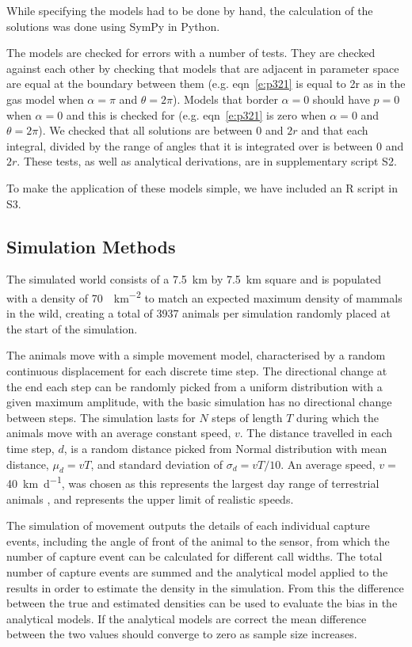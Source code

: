 \documentclass[a4paper,10pt,reqno,oneside]{amsart}
\begin{document}
While specifying the models had to be done by hand, the calculation of the solutions was done using SymPy \citep{sympy} in Python. 

The models are checked for errors with a number of tests. They are checked against each other by checking that models that are adjacent in parameter space are equal at the boundary between them (e.g. eqn~\ref{e:p321} is equal to 2r as in the gas model when $\alpha=\pi$ and $\theta=2\pi$). Models that border $ \alpha = 0$ should have $p = 0$ when $ \alpha = 0$ and this is checked for (e.g. eqn~\ref{e:p321} is zero when $\alpha=0$ and $\theta=2\pi$). We checked that all solutions are between 0 and $2r$ and that each integral, divided by the range of angles that it is integrated over is between 0 and $2r$. These tests, as well as analytical derivations, are in supplementary script S2.


To make the application of these models simple, we have included an R script in S3. 

\subsection{Simulation Methods}

The simulated world consists of a  \SI{7.5}{\kilo\meter} by \SI{7.5}{\kilo\meter} square and is populated with a density of  \SI{70}{\animals\per\kilo\meter\squared} to match an expected maximum density of mammals in the wild\citep{damuth1981population}, creating a total of 3937 animals per simulation randomly placed at the start of the simulation. 

The animals move with a simple movement model, characterised by a random continuous displacement for each discrete time step. The directional change at the end each step can be randomly picked from a uniform distribution with a given maximum amplitude, with the basic simulation has no directional change between steps. The simulation lasts for $N$ steps of length $T$ during which the animals move with an average constant speed, $v$. The distance travelled in each time step, $d$, is a random distance picked from Normal distribution with mean distance, $\mu_d = vT$,  and standard deviation of $\sigma_d = vT/10$. An average speed, $v = $ \SI{40}{\kilo\meter \per \day}, was chosen as this represents the largest day range of terrestrial animals \citep{carbone2005far}, and represents the upper limit of realistic speeds.

The simulation of movement outputs the details of each individual capture events, including the angle of front of the animal to the sensor, from which the number of capture event can be calculated for different call widths. The total number of capture events are summed and the analytical model applied to the results in order to estimate the density in the simulation. From this the difference between the true and estimated densities can be used to evaluate the bias in the analytical models. If the analytical models are correct the mean difference between the two values should converge to zero as sample size increases. 
\end{document}
